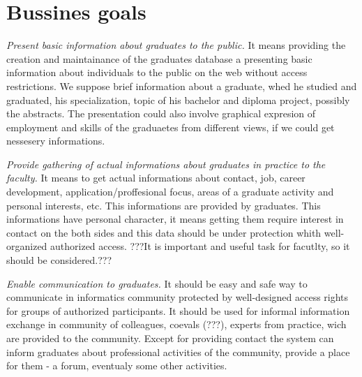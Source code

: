 \documentclass{iitsrc}[2006/14/02]
\begin{document}

\section{Bussines goals}

{\em Present basic information about graduates to the public.}
It means providing the creation and maintainance  of the graduates database a presenting basic information about individuals to the public on the web without access restrictions. We suppose brief information about a graduate, whed he studied and graduated, his specialization, topic of his bachelor and diploma project, possibly the abstracts. The presentation could also involve graphical expresion of employment and skills of the graduaetes from different views, if we could get nessesery informations.

{\em Provide gathering of actual informations about graduates in practice to the faculty.} 
It means to get actual informations about contact, job, career development, application/proffesional focus, areas of a graduate activity and personal interests, etc. This informations are provided by graduates. This informations have personal character, it means getting them require interest in contact on the both sides and this data should be under protection whith well-organized authorized access.
???It is important and useful task for facutlty, so it should be considered.???

{\em Enable communication to graduates.}
It should be easy and safe way to communicate in informatics community protected by well-designed access rights for groups of authorized participants. It should be used for informal information exchange in community of colleagues, coevals (???), experts from practice, wich are provided to the community. Except for providing contact the system can inform graduates about professional activities of the community, provide a place for them - a forum, eventualy some other activities.
\end{document}
